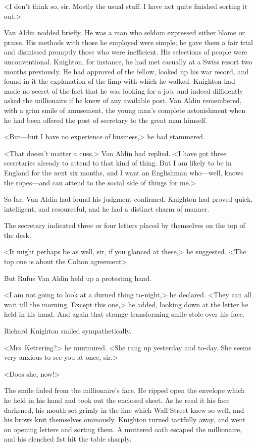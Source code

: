 <I don't think so, sir. Mostly the usual stuff. I have not quite finished sorting it out.>

Van Aldin nodded briefly. He was a man who seldom expressed either blame or praise. His methods with those he employed were simple; he gave them a fair trial and dismissed promptly those who were inefficient. His selections of people were unconventional. Knighton, for instance, he had met casually at a Swiss resort two months previously. He had approved of the fellow, looked up his war record, and found in it the explanation of the limp with which he walked. Knighton had made no secret of the fact that he was looking for a job, and indeed diffidently asked the millionaire if he knew of any available post. Van Aldin remembered, with a grim smile of amusement, the young man's complete astonishment when he had been offered the post of secretary to the great man himself.

<But—but I have no experience of business,> he had stammered.

<That doesn't matter a cuss,> Van Aldin had replied. <I have got three secretaries already to attend to that kind of thing. But I am likely to be in England for the next six months, and I want an Englishman who—well, knows the ropes—and can attend to the social side of things for me.>

So far, Van Aldin had found his judgment confirmed. Knighton had proved quick, intelligent, and resourceful, and he had a distinct charm of manner.

The secretary indicated three or four letters placed by themselves on the top of the desk.

<It might perhaps be as well, sir, if you glanced at these,> he suggested. <The top one is about the Colton agreement\longdash>

But Rufus Van Aldin held up a protesting hand.

<I am not going to look at a durned thing to-night,> he declared. <They can all wait till the morning. Except this one,> he added, looking down at the letter he held in his hand. And again that strange transforming smile stole over his face.

Richard Knighton smiled sympathetically.

<Mrs~Kettering?> he murmured. <She rang up yesterday and to-day. She seems very anxious to see you at once, sir.>

<Does she, now!>

The smile faded from the millionaire's face. He ripped open the envelope which he held in his hand and took out the enclosed sheet. As he read it his face darkened, his mouth set grimly in the line which Wall Street knew so well, and his brows knit themselves ominously. Knighton turned tactfully away, and went on opening letters and sorting them. A muttered oath escaped the millionaire, and his clenched fist hit the table sharply.

